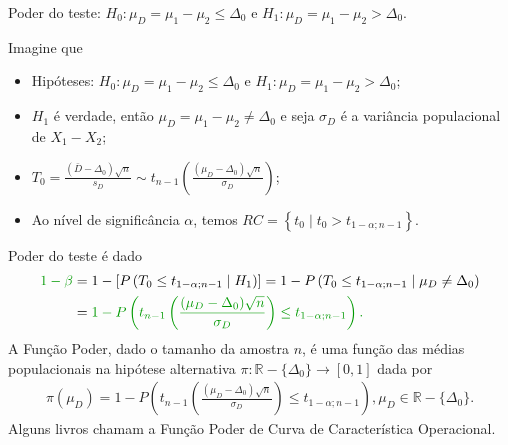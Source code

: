 \documentclass[9pt]{beamer}
\begin{document}
\begin{frame}{Poder do teste: $H_0:\mu_D = \mu_1 - \mu_2 \leq \Delta_0$ e $H_1:\mu_D =  \mu_1 - \mu_2 > \Delta_0$.}

\normalsize

Imagine que
\begin{itemize}
	\item Hipóteses: $H_0:\mu_D= \mu_1 - \mu_2 \leq \Delta_0$ e $H_1:\mu_D= \mu_1 -  \mu_2 > \Delta_0$;
	\item $H_1$ é verdade, então $\mu_D = \mu_1-\mu_2 \neq \Delta_0$ e seja $\sigma_D$ é a variância populacional de $X_1 - X_2$;
	\item $T_0 = \frac{(\bar{D} - \Delta_0)\sqrt{n}}{s_D} \sim t_{n-1}\left( \frac{(\mu_D - \Delta_0)\sqrt{n}}{\sigma_D} \right)$;
	\item Ao nível de significância $\alpha$, temos $RC = \left\{ t_0 \mid t_0 > t_{1  -\alpha;n-1}  \right\}$.
\end{itemize}
\vfill	

Poder do teste é dado
\begin{align*}
\textcolor{important}{1-\beta} &=1 - \left[P\left( T_0 \leq t_{1-\alpha;n-1}  \mid H_1 \right)\right]= 1 - P\left( T_0 \leq t_{1-\alpha;n-1} \mid \mu_D \neq \Delta_0 \right) \\ 
&= \textcolor{important}{1 - P\left( t_{n-1}\left( \frac{(\mu_D - \Delta_0)\sqrt{n}}{\sigma_D} \right) \leq t_{1-\alpha;n-1} \right).}
\end{align*}
A \textcolor{important}{Função Poder}, dado o tamanho da amostra $n$, é uma função das médias populacionais na hipótese alternativa  $\pi: \mathbb{R} -\{\Delta_0\} \longrightarrow [0,1]$ dada por
\begin{align*}
\pi(\mu_D) = 1 - P\left( t_{n-1}\left( \frac{(\mu_D - \Delta_0)\sqrt{n}}{\sigma_D} \right) \leq t_{1-\alpha;n-1} \right),  \mu_D \in \mathbb{R} - \{\Delta_0\}.
\end{align*}
Alguns livros chamam a Função Poder de \textcolor{important}{Curva de Característica Operacional.}

\normalsize

\end{frame}
\end{document}
